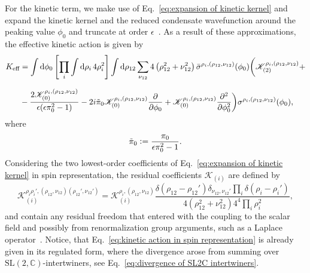 \documentclass[11pt,a4paper]{article}
\newcommand{\C}{\mathbb C}
\newcommand{\SL}{\text{SL$(2,\C)$}}
\newcommand{\defeq}{\vcentcolon=}
\begin{document}
For the kinetic term, we make use of Eq.~\eqref{eq:expansion of kinetic kernel} and expand the kinetic kernel and the reduced condensate wavefunction around the peaking value $\phi_0$ and truncate at order $\epsilon$~\cite{Marchetti:2020umh}. As a result of these approximations, the effective kinetic action is given by
%
\begin{equation}\label{eq:kinetic action in spin representation}
\begin{aligned}
K_{\text{eff}}
& =
\int\dd{\phi_0}\left[\prod_i \int\dd{\rho_i}4\rho_i^2\right]\int\dd{\rho_{12}}\sum_{\nu_{12}}4\left(\rho_{12}^2+\nu_{12}^2\right)\bar{\sigma}^{\rho_i,(\rho_{12},\nu_{12})}(\phi_0)\bigg{(}\mathscr{K}_{(2)}^{\rho_i,(\rho_{12},\nu_{12})}+\\[7pt]
&-
\frac{2\mathscr{K}_{(0)}^{\rho_i,(\rho_{12},\nu_{12})}}{\epsilon(\epsilon\pi_0^2-1)} -2i\tilde{\pi}_0\mathscr{K}_{(0)}^{\rho_i,(\rho_{12},\nu_{12})}\pdv{}{\phi_0} +{}\mathscr{K}_{(0)}^{\rho_i,(\rho_{12},\nu_{12})}\pdv[2]{}{\phi_0}\bigg{)}\sigma^{\rho_i,(\rho_{12},\nu_{12})}(\phi_0),
\end{aligned}
\end{equation}
%
where
%
\begin{equation}
\tilde{\pi}_0\defeq\frac{\pi_0}{\epsilon\pi_0^2-1}.
\end{equation}
%
Considering the two lowest-order coefficients of Eq.~\eqref{eq:expansion of kinetic kernel} in spin representation, the residual coefficients $\mathscr{K}_{(i)}$ are  defined by
%
\begin{equation}
\mathcal{K}^{\rho_i\rho_i',(\rho_{12},\nu_{12})(\rho_{12}',\nu_{12}')}_{(i)}
=
\mathscr{K}_{(i)}^{\rho_i,(\rho_{12},\nu_{12})}\frac{\delta(\rho_{12}-\rho_{12}')\delta_{\nu_{12},\nu_{12}'}\prod_i \delta(\rho_i-\rho_i')}{4\left(\rho_{12}^2+\nu_{12}^2\right)4^4 \prod_i\rho_i^2},
\end{equation}
%
and contain any residual freedom that entered with the coupling to the scalar field and possibly from renormalization group arguments, such as a Laplace operator~\cite{BenGeloun:2013mgx}. Notice, that Eq.~\eqref{eq:kinetic action in spin representation} is already given in its regulated form, where the divergence arose from summing over $\SL$-intertwiners, see Eq.~\eqref{eq:divergence of SL2C intertwiners}.
\end{document}
